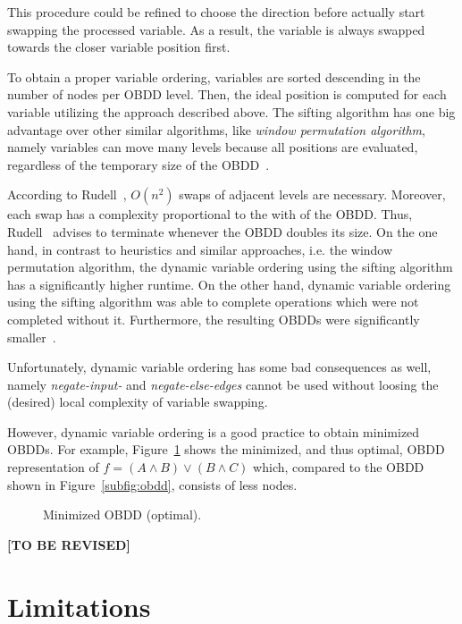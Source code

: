 \documentclass{vldb}
\newcommand{\tbr}{\textbf{[TO BE REVISED]}}
\begin{document}
This procedure could be refined to choose the direction before actually start
swapping the processed variable. As a result, the variable is always swapped
towards the closer variable position first.

To obtain a proper variable ordering, variables are sorted descending in the number
of nodes per OBDD level. Then, the ideal position is computed for each variable
utilizing the approach described above. The sifting algorithm has one big advantage
over other similar algorithms, like \textit{window permutation algorithm}, namely
variables can move many levels because all positions are evaluated, regardless of
the temporary size of the OBDD~\cite{RUDELL93}.

According to Rudell~\cite{RUDELL93}, $O(n^2)$ swaps of adjacent levels are
necessary. Moreover, each swap has a complexity proportional to the with of the
OBDD. Thus, Rudell~\cite{RUDELL93} advises to terminate whenever the OBDD doubles
its size. On the one hand, in contrast to heuristics and similar approaches, i.e.
the window permutation algorithm, the dynamic variable ordering using the sifting
algorithm has a significantly higher runtime. On the other hand, dynamic variable
ordering using the sifting algorithm was able to complete operations which were
not completed without it. Furthermore, the resulting OBDDs were significantly
smaller~\cite{RUDELL93}.

Unfortunately, dynamic variable ordering has some bad consequences as well, namely
\textit{negate-input-} and \textit{negate-else-edges} cannot be used without
loosing the (desired) local complexity of variable swapping.

However, dynamic variable ordering is a good practice to obtain minimized OBDDs.
For example, Figure~\ref{fig:min-obdd} shows the minimized, and thus optimal, OBDD
representation of \newline $f=\left(A \land B\right) \lor \left(B \land C\right)$
which, compared to the OBDD shown in Figure~\ref{subfig:obdd}, consists of less
nodes.

\begin{figure}[ht]
    \centering
    
    \caption{Minimized OBDD (optimal).}
    \label{fig:min-obdd}
\end{figure}
\tbr

\section{Limitations}
\label{sec:limitations}
\end{document}
